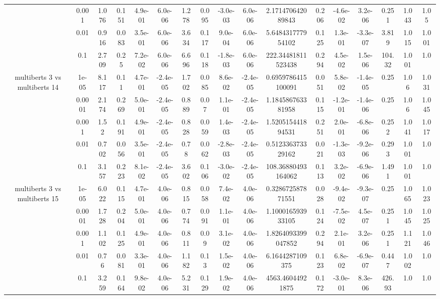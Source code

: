 \begin{tabular}{|c|c|c|c|c|c|c|c|c|c|c|c|c|c|c|c|c|}
 & 0.001 & 1.076 & 0.151 & 4.9e-01 & 6.0e-06 & 1.278 & 0.095 & -3.0e-03 & 6.0e-06 & 2.171470642089843 & 0.206 & -4.6e-02 & 3.2e-06 & 0.251 & 1.043 & 1.05 \\
 & 0.01 & 0.916 & 0.083 & 3.5e-01 & 6.0e-06 & 3.634 & 0.117 & 9.0e-04 & 6.0e-06 & 5.648431777954102 & 0.125 & 1.3e-01 & -3.3e-07 & 3.819 & 1.015 & 1.001 \\
 & 0.1 & 2.709 & 0.25 & 7.2e-02 & 6.0e-06 & 6.696 & 0.118 & -1.8e-03 & 6.0e-06 & 222.34481811523438 & 0.294 & 4.5e-02 & 1.5e-06 & 104.32 & 1.001 & 1.0 \\
\hline
\multirow{5}{*}{multiberts 3 vs multiberts 14} & 1e-05 & 8.117 & 0.11 & 4.7e-01 & -2.4e-05 & 1.702 & 0.085 & 8.6e-02 & -2.4e-05 & 0.6959786415100091 & 0.051 & 5.8e-02 & -1.4e-05 & 0.25 & 1.06 & 1.031 \\
 & 0.0001 & 2.174 & 0.269 & 5.0e-01 & -2.4e-05 & 0.889 & 0.07 & 1.1e-01 & -2.4e-05 & 1.184586763381958 & 0.115 & -1.2e-01 & -1.4e-06 & 0.25 & 1.06 & 1.045 \\
 & 0.001 & 1.52 & 0.191 & 4.9e-01 & -2.4e-05 & 0.828 & 0.059 & 1.4e-03 & -2.4e-05 & 1.520515441894531 & 0.251 & 2.0e-01 & -6.8e-06 & 0.252 & 1.041 & 1.017 \\
 & 0.01 & 0.702 & 0.056 & 3.5e-01 & -2.4e-05 & 0.78 & 0.062 & -2.8e-03 & -2.4e-05 & 0.512336373329162 & 0.021 & -1.3e-03 & -9.2e-06 & 0.293 & 1.001 & 1.0 \\
 & 0.1 & 3.157 & 0.223 & 8.1e-02 & -2.4e-05 & 3.602 & 0.106 & -3.0e-02 & -2.4e-05 & 108.36880493164062 & 0.113 & 3.2e-02 & -6.9e-06 & 1.491 & 1.001 & 1.0 \\
\hline
\multirow{5}{*}{multiberts 3 vs multiberts 15} & 1e-05 & 6.022 & 0.115 & 4.7e-01 & 4.0e-06 & 0.815 & 0.058 & 7.4e-02 & 4.0e-06 & 0.328672587871551 & 0.028 & -9.4e-02 & -9.3e-07 & 0.25 & 1.065 & 1.023 \\
 & 0.0001 & 1.728 & 0.204 & 5.0e-01 & 4.0e-06 & 0.774 & 0.091 & 1.1e-01 & 4.0e-06 & 1.100016593933105 & 0.124 & -7.5e-02 & 4.5e-07 & 0.251 & 1.045 & 1.025 \\
 & 0.001 & 1.102 & 0.125 & 4.9e-01 & 4.0e-06 & 0.811 & 0.09 & 3.1e-02 & 4.0e-06 & 1.8264093399047852 & 0.294 & 2.1e-01 & 3.2e-06 & 0.251 & 1.121 & 1.046 \\
 & 0.01 & 0.76 & 0.081 & 3.3e-01 & 4.0e-06 & 1.182 & 0.13 & 1.5e-02 & 4.0e-06 & 6.1644287109375 & 0.123 & 6.8e-02 & -6.9e-07 & 0.447 & 1.002 & 1.0 \\
 & 0.1 & 3.259 & 0.164 & 9.8e-02 & 4.0e-06 & 5.231 & 0.129 & 1.9e-02 & 4.0e-06 & 4563.46044921875 & 0.172 & -3.0e-01 & 8.3e-06 & 426.93 & 1.0 & 1.0 \\

\end{tabular}
